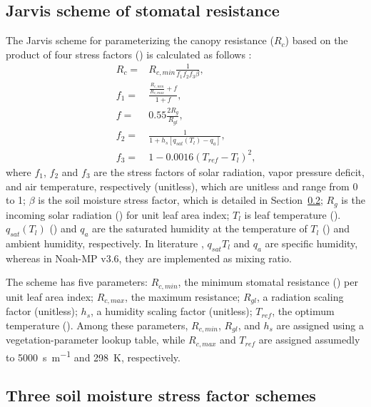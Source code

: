 \documentclass[essd, manuscript]{copernicus}
\let\unit\undefined
\begin{document}
\subsection{Jarvis scheme of stomatal resistance}\label{sec:app:noahmp:jarvis}

The Jarvis scheme for parameterizing the canopy resistance (\(R_{c}\)) based on the product of four stress factors (\unit{s.m^{-1}}) is calculated as follows \citep{chen1996JGRA, sellers1996JCa, jacquemin1990BM, jarvis1976PTRSLB}:
\begin{align}
  R_c =   & R_{c,min} \frac{1}{f_{1} f_{2} f_{3} \beta}
  \text{,} \\
  f_{1} = & \frac{\frac{R_{c,min}}{R_{c,max}}+f}{1+f}
  \text{,} \\
  f =     & 0.55 \frac{2 R_{g}}{R_{gl}}
  \text{,} \\
  f_{2} = & \frac{1}{1+h_s[q_{sat}(T_{l})-q_{a}]}
  \text{,} \\
  f_{3} = & 1- 0.0016 (T_{ref} - T_l)^2
  \text{,}
\end{align}
where \(f_{1}\), \(f_{2}\) and \(f_{3}\) are the stress factors of solar radiation, vapor pressure deficit, and air temperature, respectively (unitless), which are unitless and range from 0 to 1; \(\beta\) is the soil moisture stress factor, which is detailed in Section~\ref{sec:app:noahmp:beta}; \(R_{g}\) is the incoming solar radiation (\unit{W.m^{-2}}) for unit leaf area index; \(T_{l}\) is leaf temperature (\unit{K}). \(q_{sat}(T_l)\) (\unit{kg.kg^{-1}}) and \(q_a\) are the saturated humidity at the temperature of \(T_{l}\) (\unit{kg.kg^{-1}}) and ambient humidity, respectively. In literature \citep{chen1996JGRA, jacquemin1990BM}, \(q_{sat}{T_l}\) and \(q_a\) are specific humidity, whereas in Noah-MP v3.6, they are implemented as mixing ratio.

The scheme has five parameters: \(R_{c,min}\), the minimum stomatal resistance (\unit{s.m^{-1}}) per unit leaf area index; \(R_{c,max}\), the maximum resistance; \(R_{gl}\), a radiation scaling factor (unitless); \(h_{s}\), a humidity scaling factor (unitless); \(T_{ref}\), the optimum temperature (\unit{K}). Among these parameters, \(R_{c,min}\), \(R_{gl}\), and \(h_{s}\) are assigned using a vegetation-parameter lookup table, while \(R_{c,max}\) and \(T_{ref}\) are assigned assumedly to \qty{5000}{s.m^{-1}} and \qty{298}{K}, respectively.

\subsection{Three soil moisture stress factor schemes}\label{sec:app:noahmp:beta}
\end{document}
